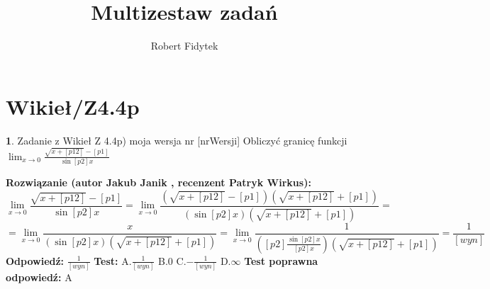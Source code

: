 \documentclass[12pt, a4paper]{article}
\title{Multizestaw zadań}
\author{Robert Fidytek}
\date{}
\theoremstyle{definition} %
\newtheorem{zad}{}
\newcommand{\kategoria}[1]{\section{#1}} %
\newcommand{\zadStart}[1]{\begin{zad}#1\newline} %
\newcommand{\zadStop}{\end{zad}}   %
\newcommand{\rozwStart}[2]{\noindent \textbf{Rozwiązanie (autor #1 , recenzent #2): }\newline} %
\newcommand{\rozwStop}{\newline}                                            %
\newcommand{\odpStart}{\noindent \textbf{Odpowiedź:}\newline}    %
\newcommand{\odpStop}{\newline}                                             %
\newcommand{\testStart}{\noindent \textbf{Test:}\newline} %
\newcommand{\testStop}{\newline} %
\newcommand{\kluczStart}{\noindent \textbf{Test poprawna odpowiedź:}\newline} %
\newcommand{\kluczStop}{\newline} %
\begin{document}
\maketitle


\kategoria{Wikieł/Z4.4p}
\zadStart{Zadanie z Wikieł Z 4.4p) moja wersja nr [nrWersji]}
Obliczyć granicę funkcji $\lim_{x \to 0} \frac{\sqrt{x+[p12]}-[p1]}{\sin{[p2]x}}$
\zadStop
\rozwStart{Jakub Janik}{Patryk Wirkus}
$$\lim_{x \to 0} \frac{\sqrt{x+[p12]}-[p1]}{\sin{[p2]x}}=\lim_{x \to 0} \frac{(\sqrt{x+[p12]}-[p1])(\sqrt{x+[p12]}+[p1])}{(\sin{[p2]x})(\sqrt{x+[p12]}+[p1])}=$$
$$=\lim_{x \to 0} \frac{x}{(\sin{[p2]x})(\sqrt{x+[p12]}+[p1])}=\lim_{x \to 0} \frac{1}{([p2]\frac{\sin{[p2]x}}{[p2]x})(\sqrt{x+[p12]}+[p1])}=\frac{1}{[wyn]}$$
\rozwStop
\odpStart
$\frac{1}{[wyn]}$
\odpStop
\testStart
A.$\frac{1}{[wyn]}$
B.$0$
C.$-\frac{1}{[wyn]}$
D.$\infty$
\testStop
\kluczStart
A
\kluczStop
\end{document}
